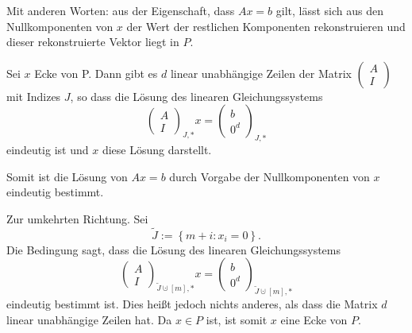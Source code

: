 \documentclass[10p,a4paper,BCOR = 12mm, DIV=15]{scrbook}
\begin{document}
{\begin{Le}
Mit anderen Worten: aus der Eigenschaft, dass $A x = b$ gilt, lässt sich aus den Nullkomponenten von $x$ der Wert der restlichen Komponenten rekonstruieren und dieser rekonstruierte Vektor liegt in $P$.
\end{Le}
\begin{bew}
Sei $x$ Ecke von P. Dann gibt es $d$ linear unabhängige Zeilen der Matrix $\left(\begin{array}{c}
A \\
I
\end{array}
\right)$ mit Indizes $J$, so dass die Lösung des linearen Gleichungssystems
\begin{displaymath}
\left(
\begin{array}{c}
A \\
I
\end{array}
\right)_{J, *} x = \left(
\begin{array}{c}
b \\
0^d
\end{array}
\right)_{J, *}
\end{displaymath}
eindeutig ist und $x$ diese Lösung darstellt.

Somit ist die Lösung von $A x = b$ durch Vorgabe der Nullkomponenten von $x$ eindeutig bestimmt.

Zur umkehrten Richtung. Sei
\begin{displaymath}
\widetilde{J} := \left\{m+i: x_i = 0\right\}.
\end{displaymath}
Die Bedingung sagt, dass die Lösung des linearen Gleichungssystems
\begin{displaymath}
\left(
\begin{array}{c}
A \\
I
\end{array}
\right)_{\widetilde{J} \cupdot \left[m\right], *} x = \left(
\begin{array}{c}
b \\
0^d
\end{array}
\right)_{\widetilde{J} \cupdot \left[m\right], *}
\end{displaymath}
eindeutig bestimmt ist. Dies heißt jedoch nichts anderes, als dass die Matrix $d$ linear unabhängige Zeilen hat. Da $x \in P$ ist, ist somit $x$ eine Ecke von $P$.
\end{bew}

}
\end{document}
